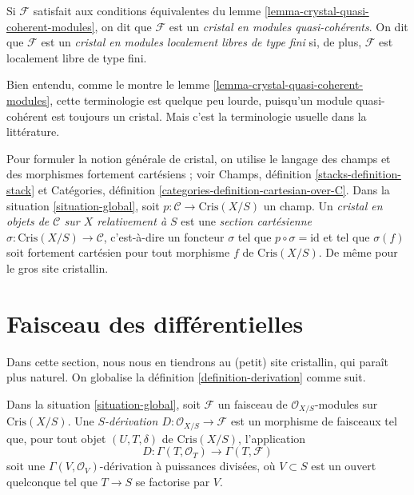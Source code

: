 \begin{definition}
\label{definition-crystal-quasi-coherent-modules}
Si $\mathcal{F}$ satisfait aux conditions équivalentes du
lemme \ref{lemma-crystal-quasi-coherent-modules}, on dit
que $\mathcal{F}$ est un
{\it cristal en modules quasi-cohérents}.
On dit que $\mathcal{F}$ est un {\it cristal en modules localement libres de type fini}
si, de plus, $\mathcal{F}$ est localement libre de type fini.
\end{definition}

\noindent
Bien entendu, comme le montre le lemme \ref{lemma-crystal-quasi-coherent-modules}, cette
terminologie est quelque peu lourde, puisqu'un module quasi-cohérent est toujours un cristal.
Mais c'est la terminologie usuelle dans la littérature.

\begin{remark}
\label{remark-crystal}
Pour formuler la notion générale de cristal, on utilise le langage
des champs et des morphismes fortement cartésiens ; voir
Champs, définition \ref{stacks-definition-stack} et
Catégories, définition \ref{categories-definition-cartesian-over-C}.
Dans la situation \ref{situation-global}, soit
$p : \mathcal{C} \to \text{Cris}(X/S)$ un champ.
Un {\it cristal en objets de $\mathcal{C}$ sur $X$ relativement à $S$}
est une {\it section cartésienne} $\sigma : \text{Cris}(X/S) \to \mathcal{C}$,
c'est-à-dire un foncteur $\sigma$ tel que $p \circ \sigma = \text{id}$
et tel que $\sigma(f)$ soit fortement cartésien pour tout
morphisme $f$ de $\text{Cris}(X/S)$. De même pour le gros site cristallin.
\end{remark}





\section{Faisceau des différentielles}
\label{section-differentials-sheaf}

\noindent
Dans cette section, nous nous en tiendrons au (petit) site cristallin,
qui paraît plus naturel. On globalise
la définition \ref{definition-derivation} comme suit.

\begin{definition}
\label{definition-global-derivation}
Dans la situation \ref{situation-global}, soit
$\mathcal{F}$ un faisceau de $\mathcal{O}_{X/S}$-modules sur
$\text{Cris}(X/S)$. Une
{\it $S$-dérivation $D : \mathcal{O}_{X/S} \to \mathcal{F}$}
est un morphisme de faisceaux tel que, pour tout objet $(U, T, \delta)$ de
$\text{Cris}(X/S)$, l'application
$$
D : \Gamma(T, \mathcal{O}_T) \longrightarrow \Gamma(T, \mathcal{F})
$$
soit une $\Gamma(V, \mathcal{O}_V)$-dérivation à puissances divisées, où $V \subset S$
est un ouvert quelconque tel que $T \to S$ se factorise par $V$.
\end{definition}

